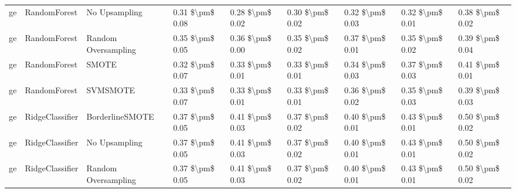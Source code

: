 \begin{tabular}{lllllllll}
      ge &                    RandomForest &                 No Upsampling & 0.31 \$\textbackslash pm\$ 0.08 &           0.28 \$\textbackslash pm\$ 0.02 &       0.30 \$\textbackslash pm\$ 0.02 &        0.32 \$\textbackslash pm\$ 0.03 &                         0.32 \$\textbackslash pm\$ 0.01 &     0.38 \$\textbackslash pm\$ 0.02 \\
      ge &                    RandomForest &           Random Oversampling & 0.35 \$\textbackslash pm\$ 0.05 &           0.36 \$\textbackslash pm\$ 0.00 &       0.35 \$\textbackslash pm\$ 0.02 &        0.37 \$\textbackslash pm\$ 0.01 &                         0.35 \$\textbackslash pm\$ 0.02 &     0.39 \$\textbackslash pm\$ 0.04 \\
      ge &                    RandomForest &                         SMOTE & 0.32 \$\textbackslash pm\$ 0.07 &           0.33 \$\textbackslash pm\$ 0.01 &       0.33 \$\textbackslash pm\$ 0.01 &        0.34 \$\textbackslash pm\$ 0.03 &                         0.37 \$\textbackslash pm\$ 0.03 &     0.41 \$\textbackslash pm\$ 0.01 \\
      ge &                    RandomForest &                      SVMSMOTE & 0.33 \$\textbackslash pm\$ 0.07 &           0.33 \$\textbackslash pm\$ 0.01 &       0.33 \$\textbackslash pm\$ 0.01 &        0.36 \$\textbackslash pm\$ 0.02 &                         0.35 \$\textbackslash pm\$ 0.03 &     0.39 \$\textbackslash pm\$ 0.03 \\
      ge &                 RidgeClassifier &               BorderlineSMOTE & 0.37 \$\textbackslash pm\$ 0.05 &           0.41 \$\textbackslash pm\$ 0.03 &       0.37 \$\textbackslash pm\$ 0.02 &        0.40 \$\textbackslash pm\$ 0.01 &                         0.43 \$\textbackslash pm\$ 0.01 &     0.50 \$\textbackslash pm\$ 0.02 \\
      ge &                 RidgeClassifier &                 No Upsampling & 0.37 \$\textbackslash pm\$ 0.05 &           0.41 \$\textbackslash pm\$ 0.03 &       0.37 \$\textbackslash pm\$ 0.02 &        0.40 \$\textbackslash pm\$ 0.01 &                         0.43 \$\textbackslash pm\$ 0.01 &     0.50 \$\textbackslash pm\$ 0.02 \\
      ge &                 RidgeClassifier &           Random Oversampling & 0.37 \$\textbackslash pm\$ 0.05 &           0.41 \$\textbackslash pm\$ 0.03 &       0.37 \$\textbackslash pm\$ 0.02 &        0.40 \$\textbackslash pm\$ 0.01 &                         0.43 \$\textbackslash pm\$ 0.01 &     0.50 \$\textbackslash pm\$ 0.02 \\

\end{tabular}
